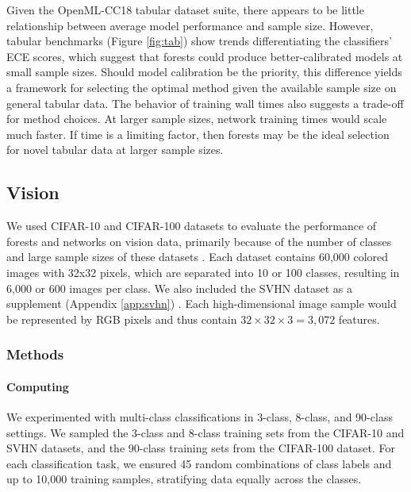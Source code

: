 Given the OpenML-CC18 tabular dataset suite, there appears to be little relationship between average model performance and sample size. However, tabular benchmarks (Figure \ref{fig:tab}) show trends differentiating the classifiers' ECE scores, which suggest that forests could produce better-calibrated models at small sample sizes. Should model calibration be the priority, this difference yields a framework for selecting the optimal method given the available sample size on general tabular data. The behavior of training wall times also suggests a trade-off for method choices. At larger sample sizes, network training times would scale much faster. If time is a limiting factor, then forests may be the ideal selection for novel tabular data at larger sample sizes.


\subsection{Vision}
\label{vision}
We used CIFAR-10 and CIFAR-100 datasets to evaluate the performance of forests and networks on vision data, primarily because of the number of classes and large sample sizes of these datasets \citep{cifar}.
Each dataset contains 60,000 colored images with 32x32 pixels, which are separated into 10 or 100 classes, resulting in 6,000 or 600 images per class.
We also included the SVHN dataset as a supplement (Appendix \ref{app:svhn}) \citep{svhn}. 
Each high-dimensional image sample would be represented by RGB pixels and thus contain $32 \times 32 \times 3 = 3,072$ features.

\subsubsection{Methods}
\paragraph{Computing}
We experimented with multi-class classifications in 3-class, 8-class, and 90-class settings. We sampled the 3-class and 8-class training sets from the CIFAR-10 and SVHN datasets, and the 90-class training sets from the CIFAR-100 dataset. For each classification task, we ensured 45 random combinations of class labels and up to 10,000 training samples, stratifying data equally across the classes.

